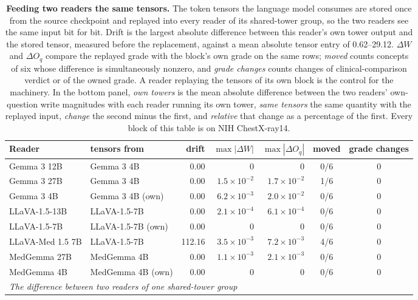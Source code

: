 \begin{table}[p]
\centering
\scriptsize
\setlength{\tabcolsep}{4pt}
\caption{\textbf{Feeding two readers the same tensors.} The token tensors the language model consumes are stored once from the source checkpoint and replayed into every reader of its shared-tower group, so the two readers see the same input bit for bit. Drift is the largest absolute difference between this reader's own tower output and the stored tensor, measured before the replacement, against a mean absolute tensor entry of 0.62--29.12. $\Delta W$ and $\Delta O_q$ compare the replayed grade with the block's own grade on the same rows; \emph{moved} counts concepts of six whose difference is simultaneously nonzero, and \emph{grade changes} counts changes of clinical-comparison verdict or of the owned grade. A reader replaying the tensors of its own block is the control for the machinery. In the bottom panel, \emph{own towers} is the mean absolute difference between the two readers' own-question write magnitudes with each reader running its own tower, \emph{same tensors} the same quantity with the replayed input, \emph{change} the second minus the first, and \emph{relative} that change as a percentage of the first. Every block of this table is on NIH ChestX-ray14.}
\label{tab:cf-replay}
\begin{tabular}{llrrrcc}
\toprule
Reader & tensors from & drift & $\max|\Delta W|$ & $\max|\Delta O_q|$ & moved & grade changes \\
\midrule
Gemma 3 12B & Gemma 3 4B & 0.00 & $0$ & $0$ & 0/6 & 0 \\
Gemma 3 27B & Gemma 3 4B & 0.00 & $1.5\times10^{-2}$ & $1.7\times10^{-2}$ & 1/6 & 0 \\
Gemma 3 4B & Gemma 3 4B (own) & 0.00 & $6.2\times10^{-3}$ & $2.0\times10^{-2}$ & 0/6 & 0 \\
LLaVA-1.5-13B & LLaVA-1.5-7B & 0.00 & $2.1\times10^{-4}$ & $6.1\times10^{-4}$ & 0/6 & 0 \\
LLaVA-1.5-7B & LLaVA-1.5-7B (own) & 0.00 & $0$ & $0$ & 0/6 & 0 \\
LLaVA-Med 1.5 7B & LLaVA-1.5-7B & 112.16 & $3.5\times10^{-3}$ & $7.2\times10^{-3}$ & 4/6 & 0 \\
MedGemma 27B & MedGemma 4B & 0.00 & $1.1\times10^{-3}$ & $2.1\times10^{-3}$ & 0/6 & 0 \\
MedGemma 4B & MedGemma 4B (own) & 0.00 & $0$ & $0$ & 0/6 & 0 \\
\midrule
\multicolumn{7}{l}{\textit{The difference between two readers of one shared-tower group}} \\

\end{tabular}
\end{table}
